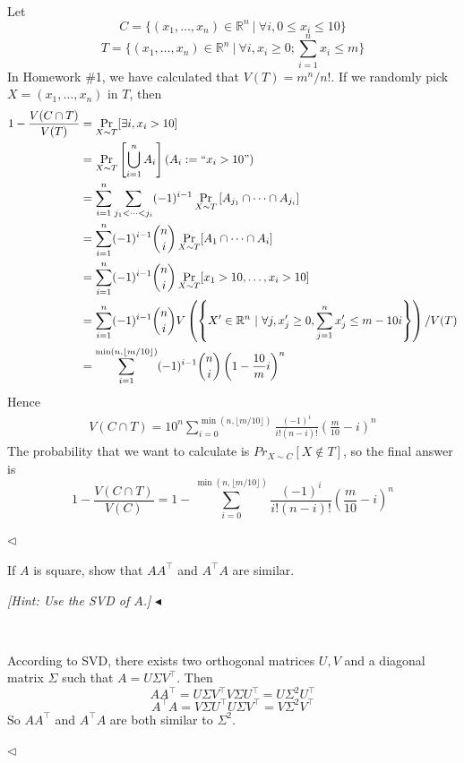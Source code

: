 \documentclass[11pt]{article}
\newenvironment{problem}[2][Problem]{\begin{trivlist}
\item[\hskip \labelsep {\bfseries #1}\hskip \labelsep {\bfseries #2.}]}{\hfill$\blacktriangleleft$\end{trivlist}}
\newenvironment{answer}[1][Answer]{\begin{trivlist}
\item[\hskip \labelsep {\bfseries #1.}\hskip \labelsep]}{\hfill$\lhd$\end{trivlist}}
\begin{document}
\begin{answer} ~

    Let 
    \[C = \{(x_1, \dots, x_n) \in \mathbb{R}^n \ | \ \forall i, 0 \le x_i \le 10\}\]
    \[T = \{(x_1, \dots, x_n) \in \mathbb{R}^n \ | \ \forall i, x_i \ge 0; \sum_{i=1}^n x_i \le m\}\]
    In Homework \#1, we have calculated that $V(T) = m^n/n!$. If we randomly pick $X = (x_1, \dots, x_n)$ in $T$, then
    \begin{align*}
        1 - \frac{V(C \cap T)}{V(T)} &= \Pr_{X \sim T}[\exists i, x_i > 10] \\
        &= \Pr_{X \sim T}\left[\bigcup_{i=1}^n A_i \right] (A_i := ``x_i > 10") \\
        &= \sum_{i=1}^n \sum_{j_1 < \dots < j_i} (-1)^{i-1} \Pr_{X \sim T}\left[A_{j_1} \cap \dots \cap A_{j_i} \right] \\
        &= \sum_{i=1}^n (-1)^{i-1} \binom{n}{i} \Pr_{X \sim T} [A_1 \cap \dots \cap A_i] \\
        &= \sum_{i=1}^n (-1)^{i-1} \binom{n}{i} \Pr_{X \sim T} [x_1 > 10, \dots, x_i > 10] \\
        &= \sum_{i=1}^n (-1)^{i-1} \binom{n}{i} V\left(\left\{X' \in \mathbb{R}^n \ | \ \forall j, x_j' \ge 0, \sum_{j=1}^n x_j' \le m - 10i \right\}\right) / V(T) \\
        &= \sum_{i=1}^{\min(n, \lfloor m/10 \rfloor)} (-1)^{i-1} \binom{n}{i} \left(1 - \frac{10}{m}i\right)^n
    \end{align*}
    Hence
    \begin{align*}
        V(C \cap T) = 10^n \sum_{i=0}^{\min(n, \lfloor m/10 \rfloor)} \frac{(-1)^{i}}{i!(n-i)!} \left(\frac{m}{10} - i\right)^n
    \end{align*}
    The probability that we want to calculate is $Pr_{X \sim C}[X \notin T]$, so the final answer is
    \[1 - \frac{V(C \cap T)}{V(C)} = 1 - \sum_{i=0}^{\min(n, \lfloor m/10 \rfloor)} \frac{(-1)^{i}}{i!(n-i)!} \left(\frac{m}{10} - i\right)^n\]
    
\end{answer}

\begin{problem}{3 (10')}
If $A$ is square, show that $AA^\top$ and $A^\top A$ are similar.

\textit{[Hint: Use the SVD of $A$.]}
\end{problem}

\begin{answer} ~

    According to SVD, there exists two orthogonal matrices $U, V$ and a diagonal matrix $\Sigma$ such that $A = U\Sigma V^\top$. Then
    \[AA^\top = U\Sigma V^\top V\Sigma U^\top = U\Sigma^2U^\top\]
    \[A^\top A = V\Sigma U^\top U \Sigma V^\top = V\Sigma^2 V^\top\]
    So $AA^\top$ and $A^\top A$ are both similar to $\Sigma^2$.
    
\end{answer}
\end{document}
